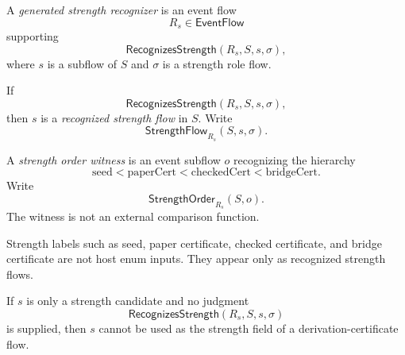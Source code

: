 \begin{definition}
\label{def:deriv-accept-generated-strength-recognizer}
A \emph{generated strength recognizer} is an event flow
$$
  R_s\in\mathsf{EventFlow}
$$
supporting
$$
  \mathsf{RecognizesStrength}(R_s,S,s,\sigma),
$$
where $s$ is a subflow of $S$ and $\sigma$ is a strength role flow.
\end{definition}

\begin{definition}
\label{def:deriv-accept-recognized-strength-flow}
If
$$
  \mathsf{RecognizesStrength}(R_s,S,s,\sigma),
$$
then $s$ is a \emph{recognized strength flow} in $S$. Write
$$
  \mathsf{StrengthFlow}_{R_s}(S,s,\sigma).
$$
\end{definition}

\begin{definition}
\label{def:deriv-accept-strength-order-witness}
A \emph{strength order witness} is an event subflow $o$ recognizing the hierarchy
$$
  \mathrm{seed}<\mathrm{paperCert}<\mathrm{checkedCert}<\mathrm{bridgeCert}.
$$
Write
$$
  \mathsf{StrengthOrder}_{R_s}(S,o).
$$
The witness is not an external comparison function.
\end{definition}

\begin{principle}
\label{prin:deriv-accept-no-strength-enum}
Strength labels such as seed, paper certificate, checked certificate, and bridge certificate are not host enum inputs. They appear only as recognized strength flows.
\end{principle}

\begin{theorem}
\label{thm:deriv-accept-strength-candidate-insufficient}
If $s$ is only a strength candidate and no judgment
$$
  \mathsf{RecognizesStrength}(R_s,S,s,\sigma)
$$
is supplied, then $s$ cannot be used as the strength field of a derivation-certificate flow.
\end{theorem}

